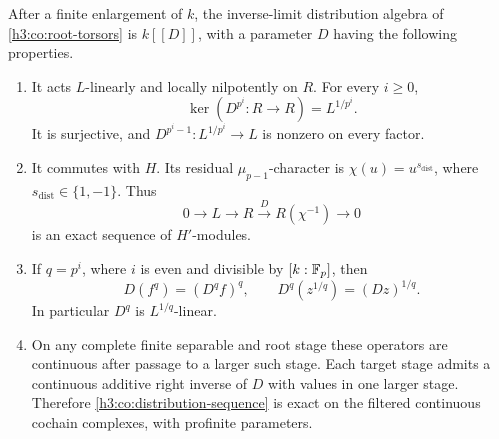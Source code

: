 \begin{lemma}\label{h3:co:distribution}
After a finite enlargement of $k$, the inverse-limit distribution
algebra of \eqref{h3:co:root-torsors} is $k[[D]]$, with a parameter $D$
having the following properties.
\begin{enumerate}
\item It acts $L$-linearly and locally nilpotently on $R$.  For every
$i\geq0$,
\[
 \ker(D^{p^i}:R\to R)=L^{1/p^i}.
\]
It is surjective, and $D^{p^i-1}:L^{1/p^i}\to L$ is nonzero on every
factor.
\item It commutes with $H$.  Its residual $\mu_{p-1}$-character is
$\chi(u)=u^{s_{\mathrm{dist}}}$, where $s_{\mathrm{dist}}\in\{1,-1\}$.  Thus
\begin{equation}\label{h3:co:distribution-sequence}
 0\longrightarrow L\longrightarrow R
 \xrightarrow{D} R(\chi^{-1})\longrightarrow0
\end{equation}
is an exact sequence of $H'$-modules.
\item If $q=p^i$, where $i$ is even and divisible by $[k:\mathbb F_p]$, then
\begin{equation}\label{h3:co:frobenius-distribution}
 D(f^q)=(D^qf)^q,\qquad
 D^q(z^{1/q})=(Dz)^{1/q}.
\end{equation}
In particular $D^q$ is $L^{1/q}$-linear.
\item On any complete finite separable and root stage these operators
are continuous after passage to a larger such stage.  Each target stage
admits a continuous additive right inverse of $D$ with values in one
larger stage.  Therefore \eqref{h3:co:distribution-sequence} is exact on
the filtered continuous cochain complexes, with profinite parameters.
\end{enumerate}
\end{lemma}

